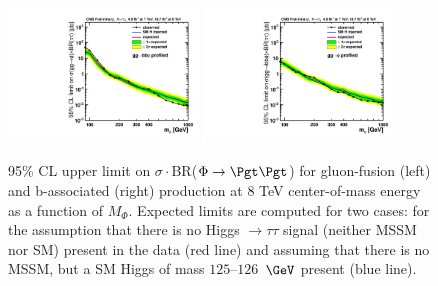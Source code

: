 \begin{figure}[!h]\begin{center}
\includegraphics[width=0.45\textwidth]{MSSM/PLOTS/cmb_ggH-limit.pdf}
\includegraphics[width=0.45\textwidth]{MSSM/PLOTS/cmb_bbH-limit.pdf}
\caption{
  95\% CL upper limit on $\sigma\cdot$BR($\Phi\to\Pgt\Pgt$) for gluon-fusion (left) and b-associated (right) production at 8 TeV center-of-mass energy as a function of $M_{\Phi}$.
  Expected limits are computed for two cases:
  for the assumption that there is no Higgs $\to \tau\tau$ signal
  (neither MSSM nor SM) present in the data (red line)
  and assuming that there is no MSSM, but a SM Higgs of mass
  $125$--$126$~$\GeV$ present (blue line).
}
  \label{fig:ggH_bbH_limit}\end{center}\end{figure}

